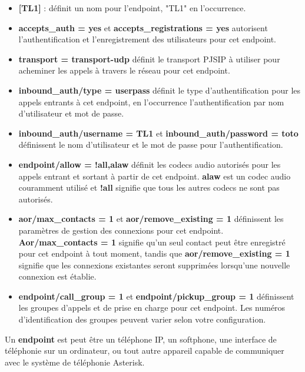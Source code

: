\documentclass[12pt, a4paper]{article}
\begin{document}
	\begin{itemize}
		\item \textbf{[TL1]} : définit un nom pour l'endpoint, "TL1" en l'occurrence.
		\item \textbf{accepts\_auth = yes} et \textbf{accepts\_registrations = yes} autorisent l'authentification et l'enregistrement des utilisateurs pour cet endpoint.
		\item \textbf{transport = transport-udp} définit le transport PJSIP à utiliser pour acheminer les appels à travers le réseau pour cet endpoint.
		\item \textbf{inbound\_auth/type = userpass} définit le type d'authentification pour les appels entrants à cet endpoint, en l'occurrence l'authentification par nom d'utilisateur et mot de passe.
		\item \textbf{inbound\_auth/username = TL1} et \textbf{inbound\_auth/password = toto} définissent le nom d'utilisateur et le mot de passe pour l'authentification.
		\item \textbf{endpoint/allow = !all,alaw} définit les codecs audio autorisés pour les appels entrant et sortant à partir de cet endpoint. \textbf{alaw} est un codec audio couramment utilisé et \textbf{!all} signifie que tous les autres codecs ne sont pas autorisés.
		\item \textbf{aor/max\_contacts = 1} et \textbf{aor/remove\_existing = 1} définissent les paramètres de gestion des connexions pour cet endpoint. \textbf{Aor/max\_contacts = 1} signifie qu'un seul contact peut être enregistré pour cet endpoint à tout moment, tandis que \textbf{aor/remove\_existing = 1} signifie que les connexions existantes seront supprimées lorsqu'une nouvelle connexion est établie.
		\item \textbf{endpoint/call\_group = 1} et \textbf{endpoint/pickup\_group = 1} définissent les groupes d'appels et de prise en charge pour cet endpoint. Les numéros d'identification des groupes peuvent varier selon votre configuration.\\
	\end{itemize}


	Un \textbf{endpoint} est peut être un téléphone IP, un softphone, 
	une interface de téléphonie sur un ordinateur, ou tout autre appareil 
	capable de communiquer avec le système de téléphonie Asterisk.
	
	\newpage
\end{document}
